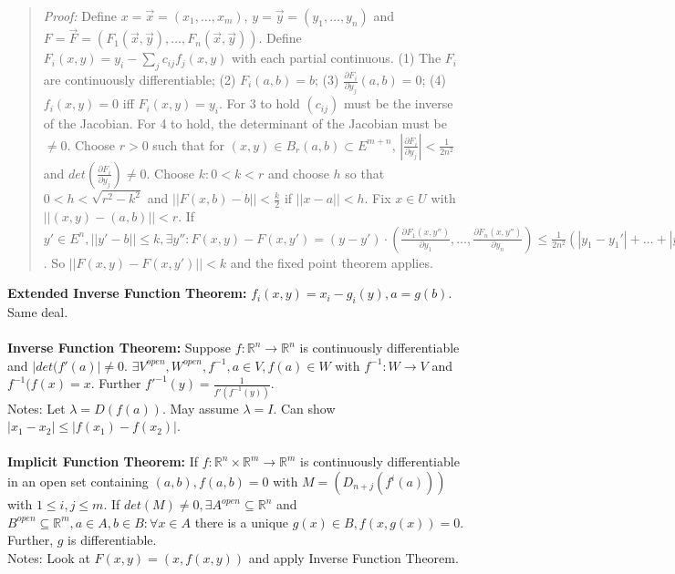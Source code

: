 \begin{quote}
\emph{Proof:}
Define $x={\vec x}= (x_1, \ldots, x_m)$,
$y={\vec y}= (y_1, \ldots, y_n)$ and $F= {\vec F}= (
F_1({\vec x}, {\vec y}) , \ldots,
F_n({\vec x}, {\vec y}))$.  Define $F_i(x,y)= y_i- \sum_j c_{ij} f_j (x,y)$ with each
partial continuous. (1) The $F_i$ are continuously differentiable; (2) $F_i(a,b)=b$;
(3) ${\frac {\partial F_i} {\partial y_j}}(a,b) = 0$; (4) $f_i(x,y)= 0$ iff
$F_i(x,y)= y_i$.  For 3 to hold $(c_{ij})$ must be the inverse of the Jacobian.  For
4 to hold, the determinant of the Jacobian must be $\ne 0$.  Choose $r>0$ such that
for $(x,y) \in B_r(a,b) \subset E^{m+n}$, 
$|{\frac {\partial F_i} {\partial y_j}}| < {\frac 1 {2n^2}}$ and
$det({\frac {\partial F_i} {\partial y_j}}) \ne 0$.  Choose $k: 0 < k < r$ and
choose $h$ so that $0 < h < {\sqrt {r^2 - k^2}}$ and
$||F(x,b) - b|| < {\frac k 2}$ if $||x-a|| < h$.  Fix $x \in U$ with
$||(x,y)-(a,b)||<r$.  If $y' \in E^n , ||y'-b|| \le k, \exists y'':
F(x,y)-F(x,y') = (y-y') \cdot 
({\frac {\partial F_1(x,y'')} {\partial y_1}}, \ldots , 
{\frac {\partial F_n(x,y'')} {\partial y_n}}) \le
{\frac 1 {2n^2}}(|y_1-y_1'| + \ldots + |y_n-y_n'|) \le {\frac 1 {2n}} ||y-y'||$.
So $||F(x,y)-F(x,y')||<k$ and the fixed point theorem applies.
\end{quote}
{\bf Extended Inverse Function Theorem:} $f_i(x,y)= x_i - g_i(y), a= g(b)$.  Same deal.
\\
\\
{\bf Inverse Function Theorem:}
Suppose $f: {\mathbb R}^n \rightarrow {\mathbb R}^n$ is continuously differentiable
and $|det(f'(a)| \ne 0$.  
$\exists V^{open}, W^{open}, f^{-1}, a \in V, f(a) \in W $ with
$f^{-1}: W \rightarrow V$ and $f^{-1}(f(x)=x$.  Further 
$f'^{-1}(y)= {\frac 1 {f'(f^{-1}(y))}}$.
\\
Notes:  Let $\lambda =D(f(a))$.  May assume $\lambda= I$.  Can show
$|x_1 - x_2 | \leq |f(x_1 ) - f(x_2 )|$.
\\
\\
{\bf Implicit Function Theorem:}  If $f: {\mathbb R}^n \times {\mathbb R}^m  
\rightarrow {\mathbb R}^m$ is continuously
differentiable in an open set containing 
$(a,b), f(a,b)=0$ with $M= (D_{n+j}(f^i (a)))$ with
$1 \leq i,j \leq m$.  If $det(M) \ne 0, \exists A^{open} \subseteq {\mathbb R}^n$ 
and $B^{open} \subseteq {\mathbb R}^m, a \in A, b \in B: \forall x \in A$ 
there is a unique $g(x) \in B, f(x,g(x))=0$.
Further, $g$ is differentiable.
\\
Notes:  Look at $F(x,y)=(x,f(x,y))$ and apply Inverse Function Theorem.
